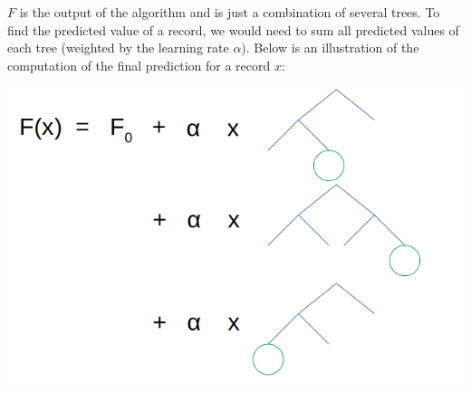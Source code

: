 $F$ is the output of the algorithm and is just a combination of several trees. To find the predicted value of a record, we would need to sum all predicted values of each tree (weighted by the learning rate $\alpha$). Below is an illustration of the computation of the final prediction for a record $x$:

\begin{center}
\includegraphics[scale=0.3]{GBM_final_function.png}
\end{center}

\vspace{5mm}